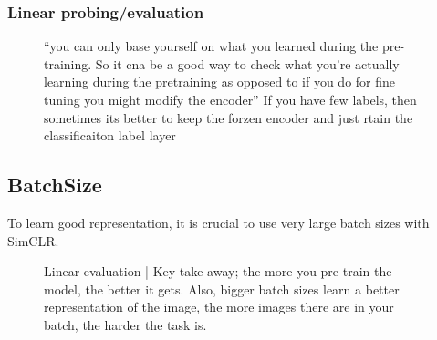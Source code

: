 \documentclass[11pt]{article}
\begin{document}
\subsubsection{Linear probing/evaluation}

\begin{figure}[H]
    \centering
    \caption*{``you can only base yourself on what you learned during the pre-training. So it cna be a good way to check what you're actually learning during the pretraining as opposed to if you do for fine tuning you might modify the encoder'' If you have few labels, then sometimes its better to keep the forzen encoder and just rtain the classificaiton label layer}
\end{figure}

\subsection{BatchSize}

To learn good representation, it is crucial to use very large batch sizes with SimCLR.

\begin{figure}[H]
    \centering
    \caption*{Linear evaluation | Key take-away; the more you pre-train the model, the better it gets. Also, bigger batch sizes learn a better representation of the image, the more images there are in your batch, the harder the task is.}
\end{figure}
\end{document}
